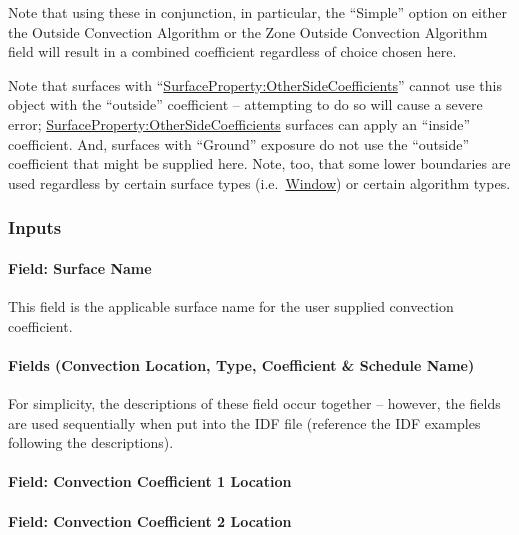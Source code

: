 Note that using these in conjunction, in particular, the ``Simple'' option on either the Outside Convection Algorithm or the Zone Outside Convection Algorithm field will result in a combined coefficient regardless of choice chosen here.

\begin{callout}
Note that surfaces with ``\hyperref[surfacepropertyothersidecoefficients]{SurfaceProperty:OtherSideCoefficients}'' cannot use this object with the ``outside'' coefficient -- attempting to do so will cause a severe error; \hyperref[surfacepropertyothersidecoefficients]{SurfaceProperty:OtherSideCoefficients} surfaces can apply an ``inside'' coefficient. And, surfaces with ``Ground'' exposure do not use the ``outside'' coefficient that might be supplied here. Note, too, that some lower boundaries are used regardless by certain surface types (i.e.~\hyperref[window]{Window}) or certain algorithm types.
\end{callout}

\subsubsection{Inputs}\label{inputs-10}

\paragraph{Field: Surface Name}\label{field-surface-name-2}

This field is the applicable surface name for the user supplied convection coefficient.

\paragraph{Fields (Convection Location, Type, Coefficient \& Schedule Name)}\label{fields-convection-location-type-coefficient-schedule-name}

For simplicity, the descriptions of these field occur together -- however, the fields are used sequentially when put into the IDF file (reference the IDF examples following the descriptions).

\paragraph{Field: Convection Coefficient 1 Location}\label{field-convection-coefficient-1-location}

\paragraph{Field: Convection Coefficient 2 Location}\label{field-convection-coefficient-2-location}

